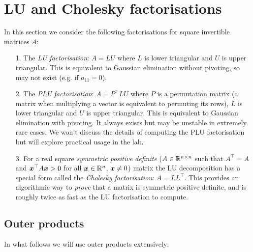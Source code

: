 
\section{LU and Cholesky factorisations}
In this section we consider the following factorisations for square invertible  matrices $A$:

\begin{itemize}
\item[1. ] The \emph{LU factorisation}: $A = LU$ where $L$ is lower triangular and $U$ is upper triangular. This is equivalent to Gaussian elimination without pivoting, so may not exist (e.g. if $a_{11} = 0$).


\item[2. ] The \emph{PLU factorisation}: $A = P^\ensuremath{\top} LU$ where $P$ is a permutation matrix (a matrix when multiplying a vector is equivalent to permuting its rows), $L$ is lower triangular and $U$ is upper triangular. This is equivalent to Gaussian elimination with pivoting. It always exists but may be unstable in extremely rare cases. We won't discuss the details of computing the PLU factorisation but will explore practical usage in the lab.


\item[3. ] For a real square \emph{symmetric positive definite} ($A \in {\mathbb R}^{n \times n}$ such that $A^\ensuremath{\top} = A$ and $\bm{{\mbox{\boldmath$x$\unboldmath}}}^\top A \bm{{\mbox{\boldmath$x$\unboldmath}}} > 0$ for all $\bm{{\mbox{\boldmath$x$\unboldmath}}} \in {\mathbb R}^n$, $\bm{{\mbox{\boldmath$x$\unboldmath}}} \neq 0$)  matrix the LU decomposition has a special form called the \emph{Cholesky factorisation}: $A = L L^\ensuremath{\top}$. This provides an algorithmic way to \emph{prove} that a matrix is symmetric positive definite, and is roughly twice as fast as the LU factorisation to compute.

\end{itemize}
\subsection{Outer products}
In what follows we will use outer products extensively:

